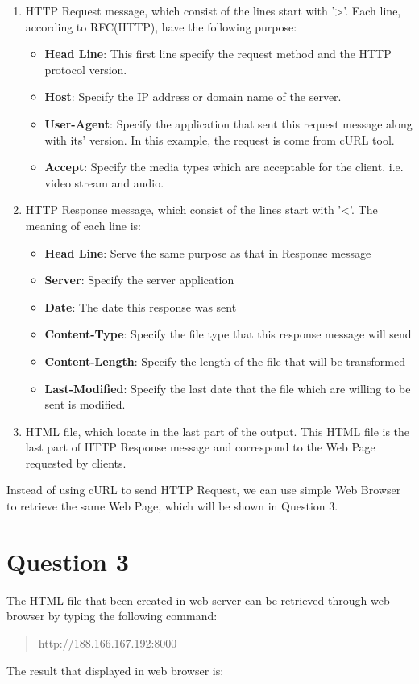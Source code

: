 \documentclass[10pt,a4paper]{article}
\begin{document}
\begin{enumerate}
	\item HTTP Request message, which consist of the lines start with '>'. Each line, according to RFC(HTTP), have the following purpose:
		\begin{itemize}
			\item \textbf{Head Line}: This first line specify the request method and the HTTP protocol version. 
			\item \textbf{Host}: Specify the IP address or domain name of the server.
			\item \textbf{User-Agent}: Specify the application that sent this request message along with its' version. In this example, the request is come from  cURL tool.
			\item \textbf{Accept}: Specify the media types which are acceptable for the client. \textsf{i.e.} video stream and audio.
		\end{itemize}
	\item HTTP Response message, which consist of the lines start with '<'. The meaning of each line is:
		\begin{itemize}
			\item \textbf{Head Line}: Serve the same purpose as that in Response message
			\item \textbf{Server}: Specify the server application
			\item \textbf{Date}: The date this response was sent
			\item \textbf{Content-Type}: Specify the file type that this response message will send
			\item \textbf{Content-Length}: Specify the length of the file that will be transformed
			\item \textbf{Last-Modified}: Specify the last date that the file which are willing to be sent is modified.
		\end{itemize}
	\item HTML file, which locate in the last part of the output. This HTML file is the last part of HTTP Response message and correspond to the Web Page requested by clients.
\end{enumerate}
Instead of using cURL to send HTTP Request, we can use simple Web Browser to retrieve the same Web Page, which will be shown in Question 3.

\section*{Question 3}
The HTML file that been created in web server can be retrieved through web browser by typing the following command:
\begin{quote}
	\center
	http://188.166.167.192:8000
\end{quote}
The result that displayed in web browser is:
\end{document}
